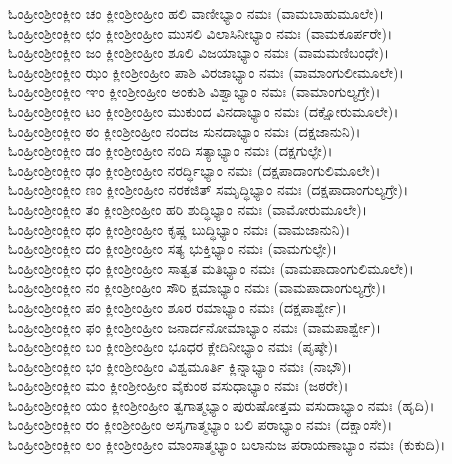 ಓಂಹ್ರೀಂಶ್ರೀಂಕ್ಲೀಂ ಚಂ ಕ್ಲೀಂಶ್ರೀಂಹ್ರೀಂ ಹಲಿ ವಾಣೀಭ್ಯಾಂ ನಮಃ (ವಾಮಬಾಹುಮೂಲೇ)।\\
ಓಂಹ್ರೀಂಶ್ರೀಂಕ್ಲೀಂ ಛಂ ಕ್ಲೀಂಶ್ರೀಂಹ್ರೀಂ ಮುಸಲಿ ವಿಲಾಸಿನೀಭ್ಯಾಂ ನಮಃ (ವಾಮಕೂರ್ಪರೇ)।\\
ಓಂಹ್ರೀಂಶ್ರೀಂಕ್ಲೀಂ ಜಂ ಕ್ಲೀಂಶ್ರೀಂಹ್ರೀಂ ಶೂಲಿ ವಿಜಯಾಭ್ಯಾಂ ನಮಃ (ವಾಮಮಣಿಬಂಧೇ)।\\
ಓಂಹ್ರೀಂಶ್ರೀಂಕ್ಲೀಂ ಝಂ ಕ್ಲೀಂಶ್ರೀಂಹ್ರೀಂ ಪಾಶಿ ವಿರಜಾಭ್ಯಾಂ ನಮಃ (ವಾಮಾಂಗುಲೀಮೂಲೇ)।\\
ಓಂಹ್ರೀಂಶ್ರೀಂಕ್ಲೀಂ ಞಂ ಕ್ಲೀಂಶ್ರೀಂಹ್ರೀಂ ಅಂಕುಶಿ ವಿಶ್ವಾಭ್ಯಾಂ ನಮಃ (ವಾಮಾಂಗುಲ್ಯಗ್ರೇ)।\\
ಓಂಹ್ರೀಂಶ್ರೀಂಕ್ಲೀಂ ಟಂ ಕ್ಲೀಂಶ್ರೀಂಹ್ರೀಂ ಮುಕುಂದ ವಿನದಾಭ್ಯಾಂ ನಮಃ (ದಕ್ಷೋರುಮೂಲೇ)।\\
ಓಂಹ್ರೀಂಶ್ರೀಂಕ್ಲೀಂ ಠಂ ಕ್ಲೀಂಶ್ರೀಂಹ್ರೀಂ ನಂದಜ ಸುನದಾಭ್ಯಾಂ ನಮಃ (ದಕ್ಷಜಾನುನಿ)।\\
ಓಂಹ್ರೀಂಶ್ರೀಂಕ್ಲೀಂ ಡಂ ಕ್ಲೀಂಶ್ರೀಂಹ್ರೀಂ ನಂದಿ ಸತ್ಯಾಭ್ಯಾಂ ನಮಃ (ದಕ್ಷಗುಲ್ಫೇ)।\\
ಓಂಹ್ರೀಂಶ್ರೀಂಕ್ಲೀಂ ಢಂ ಕ್ಲೀಂಶ್ರೀಂಹ್ರೀಂ ನರರ್ದ್ಧಿಭ್ಯಾಂ ನಮಃ (ದಕ್ಷಪಾದಾಂಗುಲಿಮೂಲೇ)।\\
ಓಂಹ್ರೀಂಶ್ರೀಂಕ್ಲೀಂ ಣಂ ಕ್ಲೀಂಶ್ರೀಂಹ್ರೀಂ ನರಕಜಿತ್ ಸಮೃದ್ಧಿಭ್ಯಾಂ ನಮಃ (ದಕ್ಷಪಾದಾಂಗುಲ್ಯಗ್ರೇ)।\\
ಓಂಹ್ರೀಂಶ್ರೀಂಕ್ಲೀಂ ತಂ ಕ್ಲೀಂಶ್ರೀಂಹ್ರೀಂ ಹರಿ ಶುದ್ಧಿಭ್ಯಾಂ ನಮಃ (ವಾಮೋರುಮೂಲೇ)।\\
ಓಂಹ್ರೀಂಶ್ರೀಂಕ್ಲೀಂ ಥಂ ಕ್ಲೀಂಶ್ರೀಂಹ್ರೀಂ ಕೃಷ್ಣ ಬುದ್ಧಿಭ್ಯಾಂ ನಮಃ (ವಾಮಜಾನುನಿ)।\\
ಓಂಹ್ರೀಂಶ್ರೀಂಕ್ಲೀಂ ದಂ ಕ್ಲೀಂಶ್ರೀಂಹ್ರೀಂ ಸತ್ಯ ಭುಕ್ತಿಭ್ಯಾಂ ನಮಃ (ವಾಮಗುಲ್ಫೇ)।\\
ಓಂಹ್ರೀಂಶ್ರೀಂಕ್ಲೀಂ ಧಂ ಕ್ಲೀಂಶ್ರೀಂಹ್ರೀಂ ಸಾತ್ವತ ಮತಿಭ್ಯಾಂ ನಮಃ (ವಾಮಪಾದಾಂಗುಲಿಮೂಲೇ)।\\
ಓಂಹ್ರೀಂಶ್ರೀಂಕ್ಲೀಂ ನಂ ಕ್ಲೀಂಶ್ರೀಂಹ್ರೀಂ ಸೌರಿ ಕ್ಷಮಾಭ್ಯಾಂ ನಮಃ (ವಾಮಪಾದಾಂಗುಲ್ಯಗ್ರೇ)।\\
ಓಂಹ್ರೀಂಶ್ರೀಂಕ್ಲೀಂ ಪಂ ಕ್ಲೀಂಶ್ರೀಂಹ್ರೀಂ ಶೂರ ರಮಾಭ್ಯಾಂ ನಮಃ (ದಕ್ಷಪಾರ್ಶ್ವೇ)।\\
ಓಂಹ್ರೀಂಶ್ರೀಂಕ್ಲೀಂ ಫಂ ಕ್ಲೀಂಶ್ರೀಂಹ್ರೀಂ ಜನಾರ್ದನೋಮಾಭ್ಯಾಂ ನಮಃ (ವಾಮಪಾರ್ಶ್ವೇ)।\\
ಓಂಹ್ರೀಂಶ್ರೀಂಕ್ಲೀಂ ಬಂ ಕ್ಲೀಂಶ್ರೀಂಹ್ರೀಂ ಭೂಧರ ಕ್ಲೇದಿನೀಭ್ಯಾಂ ನಮಃ (ಪೃಷ್ಠೇ)।\\
ಓಂಹ್ರೀಂಶ್ರೀಂಕ್ಲೀಂ ಭಂ ಕ್ಲೀಂಶ್ರೀಂಹ್ರೀಂ ವಿಶ್ವಮೂರ್ತಿ ಕ್ಲಿನ್ನಾಭ್ಯಾಂ ನಮಃ (ನಾಭೌ)।\\
ಓಂಹ್ರೀಂಶ್ರೀಂಕ್ಲೀಂ ಮಂ ಕ್ಲೀಂಶ್ರೀಂಹ್ರೀಂ ವೈಕುಂಠ ವಸುಧಾಭ್ಯಾಂ ನಮಃ (ಜಠರೇ)।\\
ಓಂಹ್ರೀಂಶ್ರೀಂಕ್ಲೀಂ ಯಂ ಕ್ಲೀಂಶ್ರೀಂಹ್ರೀಂ ತ್ವಗಾತ್ಮಭ್ಯಾಂ ಪುರುಷೋತ್ತಮ ವಸುದಾಭ್ಯಾಂ ನಮಃ (ಹೃದಿ)।\\
ಓಂಹ್ರೀಂಶ್ರೀಂಕ್ಲೀಂ ರಂ ಕ್ಲೀಂಶ್ರೀಂಹ್ರೀಂ ಅಸೃಗಾತ್ಮಭ್ಯಾಂ ಬಲಿ ಪರಾಭ್ಯಾಂ ನಮಃ (ದಕ್ಷಾಂಸೇ)।\\
ಓಂಹ್ರೀಂಶ್ರೀಂಕ್ಲೀಂ ಲಂ ಕ್ಲೀಂಶ್ರೀಂಹ್ರೀಂ ಮಾಂಸಾತ್ಮಭ್ಯಾಂ ಬಲಾನುಜ ಪರಾಯಣಾಭ್ಯಾಂ ನಮಃ (ಕುಕುದಿ)।\\
